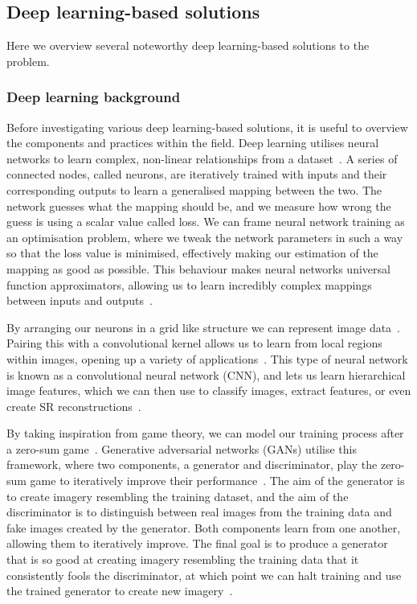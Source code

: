 \subsection{Deep learning-based solutions}
Here we overview several noteworthy deep learning-based solutions to the problem.

\subsubsection{Deep learning background}
Before investigating various deep learning-based solutions, it is useful to overview the components and practices within the field. Deep learning utilises neural networks to learn complex, non-linear relationships from a dataset~\cite{nn}. A series of connected nodes, called neurons, are iteratively trained with inputs and their corresponding outputs to learn a generalised mapping between the two. The network guesses what the mapping should be, and we measure how wrong the guess is using a scalar value called loss. We can frame neural network training as an optimisation problem, where we tweak the network parameters in such a way so that the loss value is minimised, effectively making our estimation of the mapping as good as possible. This behaviour makes neural networks universal function approximators, allowing us to learn incredibly complex mappings between inputs and outputs~\cite{nn}.

By arranging our neurons in a grid like structure we can represent image data~\cite{imageNet}. Pairing this with a convolutional kernel allows us to learn from local regions within images, opening up a variety of applications~\cite{imageNet}. This type of neural network is known as a convolutional neural network (CNN), and lets us learn hierarchical image features, which we can then use to classify images, extract features, or even create SR reconstructions~\cite{vgg19,imageNet,srcnn}.

By taking inspiration from game theory, we can model our training process after a zero-sum game~\cite{gan}. Generative adversarial networks (GANs) utilise this framework, where two components, a generator and discriminator, play the zero-sum game to iteratively improve their performance~\cite{gan}. The aim of the generator is to create imagery resembling the training dataset, and the aim of the discriminator is to distinguish between real images from the training data and fake images created by the generator. Both components learn from one another, allowing them to iteratively improve. The final goal is to produce a generator that is so good at creating imagery resembling the training data that it consistently fools the discriminator, at which point we can halt training and use the trained generator to create new imagery~\cite{gan}.

